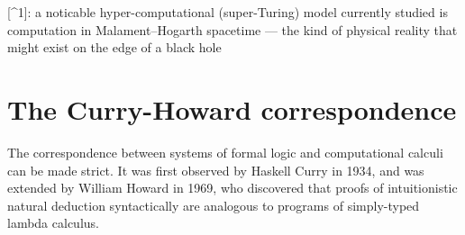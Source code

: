 [^1]: a noticable hyper-computational (super-Turing) model currently studied is
computation in Malament--Hogarth spacetime --- the kind of physical reality that might exist
on the edge of a black hole

\section{The Curry-Howard correspondence}
The correspondence between systems of formal logic and computational calculi can be made strict.
It was first observed by Haskell Curry in 1934, and was extended by William Howard in 1969, who
discovered that proofs of intuitionistic natural deduction syntactically are analogous to programs
of simply-typed lambda calculus.


